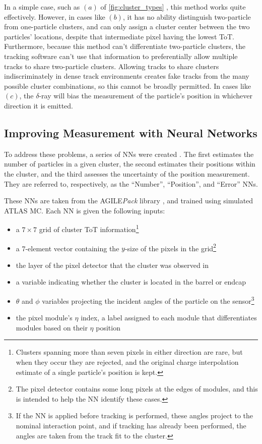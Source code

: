 In a simple case, such as $(a)$ of \autoref{fig:cluster_types} , this method works quite effectively. However, in cases like $(b)$, it has no ability distinguish two-particle from one-particle clusters, and can only assign a cluster center between the two particles' locations, despite that intermediate pixel having the lowest \ac{ToT}. Furthermore, because this method can't differentiate two-particle clusters, the tracking software can't use that information to preferentially allow multiple tracks to share two-particle clusters. Allowing tracks to share clusters indiscriminately in dense track environments creates fake tracks from the many possible cluster combinations, so this cannot be broadly permitted. In cases like $(c)$, the $\delta$-ray will bias the measurement of the particle's position in whichever direction it is emitted. 

\subsection{Improving Measurement with Neural Networks}

To address these problems, a series of \acp{NN} were created \cite{PERF-2012-05}. The first estimates the number of particles in a given cluster, the second estimates their positions within the cluster, and the third assesses the uncertainty of the position measurement. They are referred to, respectively, as the ``Number'', ``Position'', and ``Error'' \acp{NN}.

These \acp{NN} are taken from the AGILE\textit{Pack} library \cite{agile}, and trained using simulated ATLAS \ac{MC}. Each \ac{NN} is given the following inputs: 
\begin{itemize}
\item a $7\times7$ grid of cluster \ac{ToT} information\footnote{Clusters spanning more than seven pixels in either direction are rare, but when they occur they are rejected, and the original charge interpolation estimate of a single particle's position is kept.}
\item a 7-element vector containing the $y$-size of the pixels in the grid\footnote{The pixel detector contains some long pixels at the edges of modules, and this is intended to help the \ac{NN} identify these cases.}
\item the layer of the pixel detector that the cluster was observed in
\item a variable indicating whether the cluster is located in the barrel or endcap
\item $\theta$ and $\phi$ variables projecting the incident angles of the particle on the sensor\footnote{If the \ac{NN} is applied before tracking is performed, these angles project to the nominal interaction point, and if tracking has already been performed, the angles are taken from the track fit to the cluster.}
\item the pixel module's $\eta$ index, a label assigned to each module that differentiates modules based on their $\eta$ position
\end{itemize}


